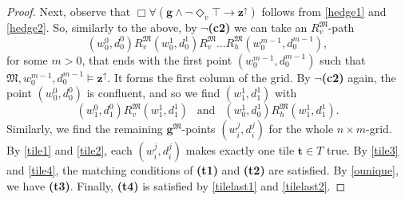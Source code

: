 \documentclass[10pt,a4paper]{amsart}
\theoremstyle{plain}
\theoremstyle{definition}
\newcommand{\tiling}{\mathfrak T}
\newcommand{\bbvarup}{\Zvar^\uparrow}
\newcommand{\bbvarright}{\Zvar^\to}
\newcommand{\Dvt}[1]{\Diamond_v{#1}}
\newcommand{\fform}[1]{\boldsymbol{#1}}
\newcommand{\gvar}{\fform{g}}
\newcommand{\tvar}{\fform{t}}
\newcommand{\Zvar}{\fform{z}}
\newcommand{\Bv}{\forall}
\newcommand{\Bh}{\Box}
\begin{document}
\begin{proof}
	Next, observe that $\Bh\Bv (\gvar \wedge \neg \Dvt{\top} \rightarrow \bbvarup)$ follows from 
	\eqref{hedge1} and \eqref{hedge2}.
	So, similarly to the above, by $\neg$\textbf{(c2)} 
	we can take an $R_{v}^\mathfrak M$-path
	$$
	(w_0^0,d_0^0) R_{v}^\mathfrak M (w_0^1,d_0^1) R_{v}^\mathfrak M \dots R_{h}^\mathfrak M (w_0^{m-1},d_0^{m-1}),
	$$
	for some $m>0$, that ends with the first point $(w^{m-1}_0,d^{m-1}_0)$ such that 
	$\mathfrak M,w^{m-1}_0,d^{m-1}_0 \models \bbvarup$. It forms the first column of the grid. 
	By $\neg$\textbf{(c2)} again, the point $(w_0^0,d_0^0)$ is confluent, and so we find $(w_1^1,d_1^1)$ with
	$$
	(w_1^0,d_1^0) R_{v}^\mathfrak M (w_1^1,d_1^1) \ \ \text{ and } \ \ (w^1_0,d^1_0) R_{h}^\mathfrak M (w_1^1,d_1^1).
	$$
	Similarly, we find the remaining $\gvar^\mathfrak M$-points $(w_i^j,d_i^j)$ for the whole $n\times m$-grid.
	By \eqref{tile1} and \eqref{tile2},
	each $(w_i^j,d_i^j)$ makes exactly one tile $\tvar\in T$ true.
	By \eqref{tile3} and \eqref{tile4}, the matching conditions of 
	\textbf{(t1)} and \textbf{(t2)} are satisfied. By \eqref{ounique}, we have \textbf{(t3)}.
	Finally, \textbf{(t4)} is satisfied by \eqref{tilelast1} and \eqref{tilelast2}.
\end{proof}
\end{document}
